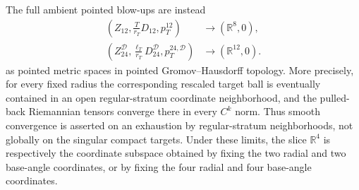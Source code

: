 \begin{theorem}
The full ambient pointed blow-ups are instead
\begin{align}
 \left(Z_{12},\frac{T}{r_T}D_{12},p_T^{12}\right)
 &\longrightarrow(\mathbb R^8,0),\\
 \left(Z_{24}^{\mathcal D},
       \frac{\ell_T}{r_T}D_{24}^{\mathcal D},
       p_T^{24,\mathcal D}\right)
 &\longrightarrow(\mathbb R^{12},0).
 \label{wb:sphere-metric-ambient-fixed-blowups}
\end{align}
as pointed metric spaces in pointed Gromov--Hausdorff topology.  More
precisely, for every fixed radius the corresponding rescaled target ball is
eventually contained in an open regular-stratum coordinate neighborhood,
and the pulled-back Riemannian tensors converge there in every \(C^k\) norm.
Thus smooth convergence is asserted on an exhaustion by regular-stratum
neighborhoods, not globally on the singular compact targets.  Under these
limits, the slice \(\mathbb R^4\) is respectively the coordinate subspace
obtained by fixing the two radial and two base-angle coordinates, or by
fixing the four radial and four base-angle coordinates.
\end{theorem}

